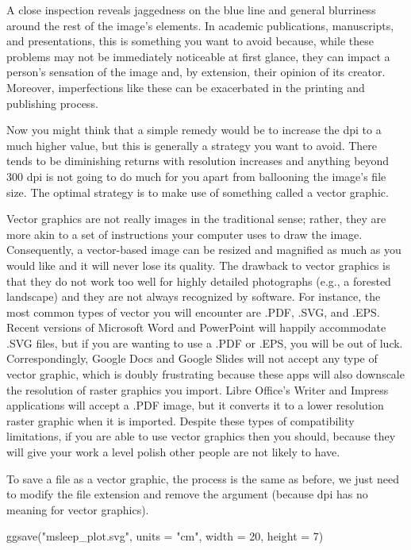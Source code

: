 A close inspection reveals jaggedness on the blue line and general blurriness around the rest of the image's elements. In academic publications, manuscripts, and presentations, this is something you want to avoid because, while these problems may not be immediately noticeable at first glance, they can impact a person's sensation of the image and, by extension, their opinion of its creator. Moreover, imperfections like these can be exacerbated in the printing and publishing process.

Now you might think that a simple remedy would be to increase the dpi to a much higher value, but this is generally a strategy you want to avoid.  There tends to be diminishing returns with resolution increases and anything beyond 300 dpi is not going to do much for you apart from ballooning the image's file size. The optimal strategy is to make use of something called a vector graphic.

Vector graphics are not really images in the traditional sense; rather, they are more akin to a set of instructions your computer uses to draw the image. Consequently, a vector-based image can be resized and magnified as much as you would like and it will never lose its quality. The drawback to vector graphics is that they do not work too well for highly detailed photographs (e.g., a forested landscape) and they are not always recognized by software. For instance, the most common types of vector you will encounter are .PDF, .SVG, and .EPS.  Recent versions of Microsoft Word and PowerPoint will happily accommodate .SVG files, but if you are wanting to use a .PDF or .EPS, you will be out of luck. Correspondingly, Google Docs and Google Slides will not accept any type of vector graphic, which is doubly frustrating because these apps will also downscale the resolution of raster graphics you import. Libre Office's Writer and Impress applications will accept a .PDF image, but it converts it to a lower resolution raster graphic when it is imported. Despite these types of compatibility limitations, if you are able to use vector graphics then you should, because they will give your work a level polish other people are not likely to have.

To save a file as a vector graphic, the process is the same as before, we just need to modify the file extension and remove the  argument (because dpi has no meaning for vector graphics).

\begin{inR}
ggsave("msleep_plot.svg", units = "cm", width = 20, height = 7)
\end{inR}

